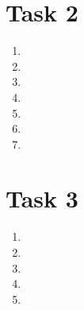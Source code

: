 \documentclass[a4paper,11pt,norsk]{article}
\begin{document}
\section*{Task 2}
\begin{enumerate}
    \item 
    \item 
    \item 
    \item
    \item 
    \item 
    \item
\end{enumerate}

\section*{Task 3}
\begin{enumerate}
    \item 
    \item
    \item 
    \item 
    \item
\end{enumerate}
\end{document}
